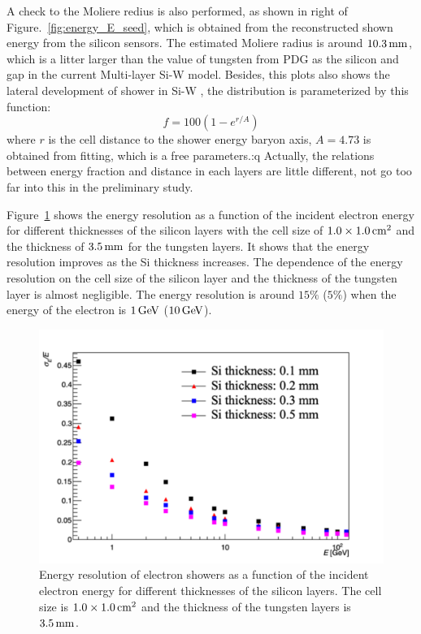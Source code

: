 A check to the Moliere redius is also performed, as shown in right of Figure.~\ref{fig:energy_E_seed}, 
which is obtained from the reconstructed shown energy from the silicon sensors.
The estimated Moliere radius is around $10.3\text{\,mm}$, which is a litter larger than the value of tungsten from PDG as the silicon and gap in the current Multi-layer Si-W \ecal model.
Besides, 
this plots also shows the lateral development of shower in Si-W \ecal,
the  distribution is parameterized by this function:
\begin{equation}
f = 100(1-e^{r/A})
\end{equation}
where $r$ is the cell distance to the shower energy baryon axis, 
$A=4.73$ is obtained from fitting, 
which is a free parameters.:q
Actually, 
the relations between energy fraction and distance in each layers are little different,
not go too far into this in the preliminary study.


Figure~\ref{fig:energyresolutionSiW} shows the energy resolution as a function of the incident electron energy for different thicknesses of the silicon layers with the cell size of $1.0\times1.0\text{\,cm}^2$ and the thickness of $3.5\text{\,mm}$ for the tungsten layers. 
It shows that the energy resolution improves as the Si thickness increases. 
The dependence of the energy resolution on the cell size of the silicon layer and the thickness of the tungsten layer is almost negligible.
The energy resolution is around $15\%$ ($5\%$) when the energy of the electron is $1\text{\,Ge\kern -0.1em V}$ ($10\text{\,Ge\kern -0.1em V}$).
\begin{figure}[tb]
  \begin{center}
    \includegraphics[width=0.6\linewidth]{Figures/06_ECAL/plotsZW/resolutionE_compare_Siwidth_1x1.pdf}%
    \vspace*{-0.5cm}
  \end{center}
  \caption{
  Energy resolution of electron showers as a function of the incident electron energy for different thicknesses of the silicon layers. 
   The cell size is $1.0\times1.0\text{\,cm}^2$ and the thickness of the tungsten layers is $3.5\text{\,mm}$.
  }
  \label{fig:energyresolutionSiW}
\end{figure}


